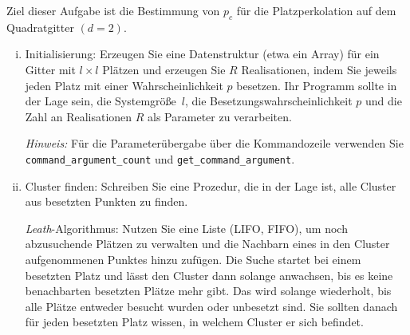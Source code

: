 \begin{question}[subtitle=Perkolationschwelle]
  Ziel dieser Aufgabe ist die Bestimmung von $p_c$ für die Platzperkolation auf dem Quadratgitter $(d = 2)$.
  \begin{enumerate}[(i)]
  \item Initialisierung: Erzeugen Sie eine Datenstruktur (etwa ein Array) für ein Gitter mit $l \times l$ Plätzen und erzeugen Sie $R$ Realisationen, indem Sie jeweils jeden Platz mit einer Wahrscheinlichkeit $p$ besetzen.
    Ihr Programm sollte in der Lage sein, die Systemgröße~$l$, die Besetzungswahrscheinlichkeit $p$ und die Zahl an Realisationen $R$ als Parameter zu verarbeiten.

    \begin{sloppypar}
      \textit{Hinweis:} Für die Parameterübergabe über die Kommandozeile verwenden Sie \texttt{command_argument_count} und \texttt{get_command_argument}.
    \end{sloppypar}
  \item Cluster finden: Schreiben Sie eine Prozedur, die in der Lage ist, alle Cluster aus besetzten Punkten zu finden.

    \textit{Leath}-Algorithmus: Nutzen Sie eine Liste (LIFO, FIFO), um noch abzusuchende Plätzen zu verwalten und die Nachbarn eines in den Cluster aufgenommenen Punktes hinzu zufügen.
    Die Suche startet bei einem besetzten Platz und lässt den Cluster dann solange anwachsen, bis es keine benachbarten besetzten Plätze mehr gibt.
    Das wird solange wiederholt, bis alle Plätze entweder besucht wurden oder unbesetzt sind.
    Sie sollten danach für jeden besetzten Platz wissen, in welchem Cluster er sich befindet.


\end{enumerate}
\end{question}
